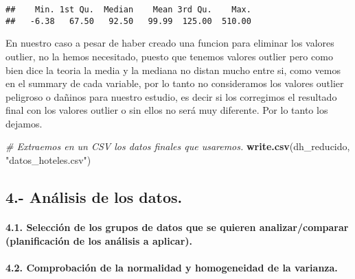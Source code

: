 \documentclass[]{article}
\newenvironment{Shaded}{\begin{snugshade}}{\end{snugshade}}
\newcommand{\CommentTok}[1]{\textcolor[rgb]{0.56,0.35,0.01}{\textit{#1}}}
\newcommand{\KeywordTok}[1]{\textcolor[rgb]{0.13,0.29,0.53}{\textbf{#1}}}
\newcommand{\NormalTok}[1]{#1}
\newcommand{\StringTok}[1]{\textcolor[rgb]{0.31,0.60,0.02}{#1}}
\let\oldparagraph\paragraph
\renewcommand{\paragraph}[1]{\oldparagraph{#1}\mbox{}}
\begin{document}
\begin{verbatim}
##    Min. 1st Qu.  Median    Mean 3rd Qu.    Max. 
##   -6.38   67.50   92.50   99.99  125.00  510.00
\end{verbatim}

En nuestro caso a pesar de haber creado una funcion para eliminar los
valores outlier, no la hemos necesitado, puesto que tenemos valores
outlier pero como bien dice la teoria la media y la mediana no distan
mucho entre si, como vemos en el summary de cada variable, por lo tanto
no consideramos los valores outlier peligroso o dañinos para nuestro
estudio, es decir si los corregimos el resultado final con los valores
outlier o sin ellos no será muy diferente. Por lo tanto los dejamos.

\begin{Shaded}
\begin{Highlighting}[]
\CommentTok{# Extraemos en un CSV los datos finales que usaremos.}
\KeywordTok{write.csv}\NormalTok{(dh_reducido, }\StringTok{"datos_hoteles.csv"}\NormalTok{)}
\end{Highlighting}
\end{Shaded}

\hypertarget{anuxe1lisis-de-los-datos.}{%
\subsection{4.- Análisis de los
datos.}\label{anuxe1lisis-de-los-datos.}}

\hypertarget{selecciuxf3n-de-los-grupos-de-datos-que-se-quieren-analizarcomparar-planificaciuxf3n-de-los-anuxe1lisis-a-aplicar.}{%
\paragraph{4.1. Selección de los grupos de datos que se quieren
analizar/comparar (planificación de los análisis a
aplicar).}\label{selecciuxf3n-de-los-grupos-de-datos-que-se-quieren-analizarcomparar-planificaciuxf3n-de-los-anuxe1lisis-a-aplicar.}}

\hypertarget{comprobaciuxf3n-de-la-normalidad-y-homogeneidad-de-la-varianza.}{%
\paragraph{4.2. Comprobación de la normalidad y homogeneidad de la
varianza.}\label{comprobaciuxf3n-de-la-normalidad-y-homogeneidad-de-la-varianza.}}
\end{document}
